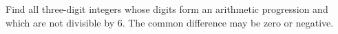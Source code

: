 Find all three-digit integers whose digits form an arithmetic progression and which are not divisible by 6. The common difference may be zero or negative.
